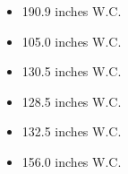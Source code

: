 \begin{itemize}
\item{} 190.9 inches W.C.
\vskip 5pt 
\item{} 105.0 inches W.C.
\vskip 5pt 
\item{} 130.5 inches W.C.
\vskip 5pt 
\item{} 128.5 inches W.C.
\vskip 5pt 
\item{} 132.5 inches W.C.
\vskip 5pt 
\item{} 156.0 inches W.C.
\end{itemize}





